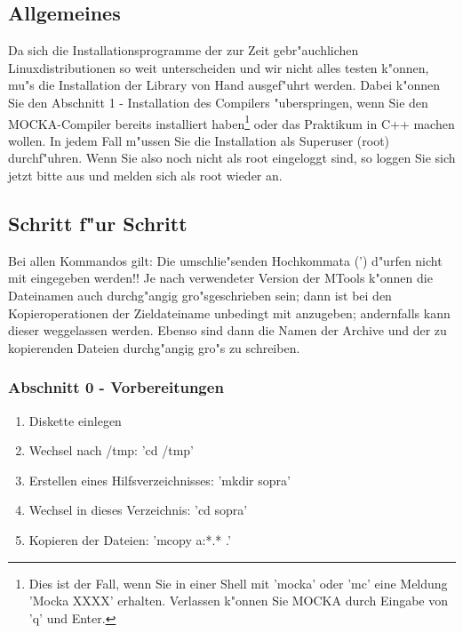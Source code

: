 \subsection{Allgemeines}
Da sich die Installationsprogramme der zur Zeit gebr"auchlichen
Linuxdistributionen so weit unterscheiden und wir nicht alles testen
k"onnen, mu"s die Installation der Library von Hand ausgef"uhrt werden.
Dabei k"onnen Sie den Abschnitt 1 - Installation des Compilers "uberspringen,
wenn Sie den MOCKA-Compiler bereits installiert haben\footnote{Dies ist
der Fall, wenn Sie in einer Shell mit 'mocka' oder 'mc'
eine Meldung 'Mocka XXXX' erhalten. Verlassen k"onnen Sie MOCKA durch Eingabe
von 'q' und Enter.} oder das Praktikum in C++ machen wollen.
In jedem Fall m"ussen Sie die Installation als Superuser (root) durchf"uhren.
Wenn Sie also noch nicht als root eingeloggt sind, so loggen Sie sich jetzt
bitte aus und melden sich als root wieder an.

\subsection{Schritt f"ur Schritt}
Bei allen Kommandos gilt: Die umschlie"senden Hochkommata (') d"urfen nicht
mit eingegeben werden!! Je nach verwendeter Version der MTools k"onnen die
Dateinamen auch durchg"angig gro"sgeschrieben sein; dann ist bei den
Kopieroperationen der Zieldateiname unbedingt mit anzugeben; andernfalls
kann dieser weggelassen werden. Ebenso sind dann die Namen der Archive und
der zu kopierenden Dateien durchg"angig gro"s zu schreiben.

\subsubsection{Abschnitt 0 - Vorbereitungen}
\begin{enumerate}
\item{Diskette einlegen}
\item{Wechsel nach /tmp: 'cd /tmp'}
\item{Erstellen eines Hilfsverzeichnisses: 'mkdir sopra'}
\item{Wechsel in dieses Verzeichnis: 'cd sopra'}
\item{Kopieren der Dateien: 'mcopy a:*.* .'}
\end{enumerate}


